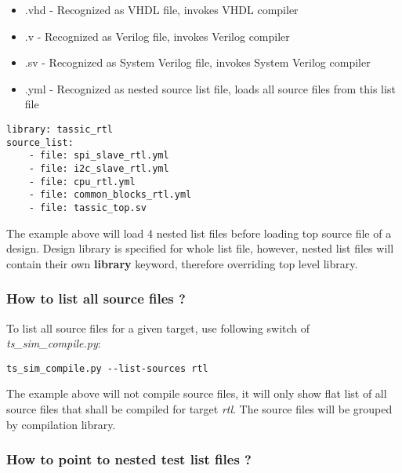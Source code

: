\documentclass{tropic_design_spec}
\begin{document}
\begin{itemize}
    \item{.vhd     - Recognized as VHDL file, invokes VHDL compiler}
    \item{.v       - Recognized as Verilog file, invokes Verilog compiler}
    \item{.sv      - Recognized as System Verilog file, invokes System Verilog compiler}
    \item{.yml     - Recognized as nested source list file, loads all source files
                     from this list file}
\end{itemize}

\begin{lstlisting}
library: tassic_rtl
source_list:
    - file: spi_slave_rtl.yml
    - file: i2c_slave_rtl.yml
    - file: cpu_rtl.yml
    - file: common_blocks_rtl.yml
    - file: tassic_top.sv
\end{lstlisting}

The example above will load 4 nested list files before loading top source file of
a design. Design library is specified for whole list file, however, nested list
files will contain their own \textbf{library} keyword, therefore overriding top
level library.


\subsubsection{How to list all source files ?}
\label{sec:how-to-list-all-source-files}

To list all source files for a given target, use following switch of
\textit{ts_sim_compile.py}:

\begin{lstlisting}
ts_sim_compile.py --list-sources rtl
\end{lstlisting}

The example above will not compile source files, it will only show flat list
of all source files that shall be compiled for target \textit{rtl}. The source
files will be grouped by compilation library.


\subsubsection{How to point to nested test list files ?}
\label{sec:how-to-point-to-nested-test-list-files}
\end{document}
